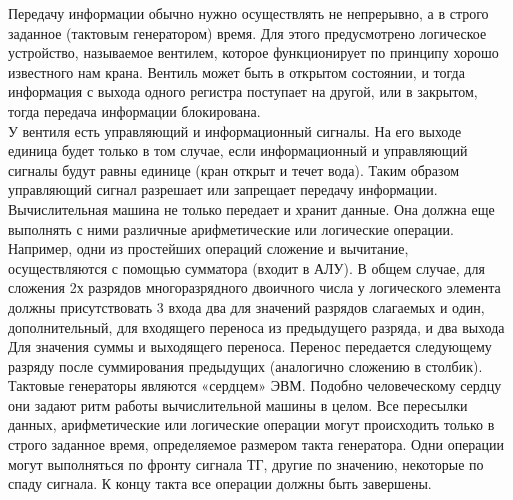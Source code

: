 Передачу информации обычно нужно осуществлять не непрерывно, а в строго заданное (тактовым генератором) время. Для этого предусмотрено логическое устройство, называемое вентилем, которое функционирует по принципу хорошо известного нам крана. Вентиль может быть в открытом состоянии, и тогда информация с выхода одного регистра поступает на другой, или в закрытом, тогда передача информации блокирована. \\
У вентиля есть управляющий и информационный сигналы. На его выходе единица будет только в том случае, если информационный и управляющий сигналы будут равны единице (кран открыт и течет вода). Таким образом управляющий сигнал разрешает или запрещает передачу информации. \\
Вычислительная машина не только передает и хранит данные. Она должна еще выполнять с ними различные арифметические или логические операции. Например, одни из простейших операций сложение и вычитание, осуществляются с помощью сумматора (входит в АЛУ). В общем случае, для сложения 2х разрядов многоразрядного двоичного числа у логического элемента должны присутствовать 3 входа два для значений разрядов слагаемых и один, дополнительный, для входящего переноса из предыдущего разряда, и два выхода Для значения суммы и выходящего переноса. Перенос передается следующему разряду после суммирования предыдущих (аналогично сложению в столбик). \\
Тактовые генераторы являются «сердцем» ЭВМ. Подобно человеческому сердцу они задают ритм работы вычислительной машины в целом. Все пересылки данных, арифметические или логические операции могут происходить только в строго заданное время, определяемое размером такта генератора. Одни операции могут выполняться по фронту сигнала ТГ, другие по значению, некоторые по спаду сигнала. К концу такта все операции должны быть завершены.  \\


